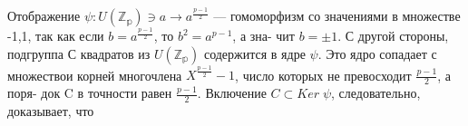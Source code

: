 \begin{myproof}
 Отображение $\psi : U(\mathbb{Z_{p}}) \owns a \to a^{\frac{p-1}{2}}$ --- гомоморфизм со значениями \linebreak  в множестве {-1,1}, так как если $b = a^{\frac{p-1}{2}}$, то $b^{2} = a^{p-1}$, а зна- \linebreak чит $b = \pm 1$. С другой стороны, подгруппа С квадратов из $U(\mathbb{Z_{p}})$ \linebreak содержится в ядре $\psi$. Это ядро сопадает с множествои корней \linebreak многочлена $X^{\frac{p-1}{2}} - 1$, число которых не превосходит $\frac{p-1}{2}$, а поря- \linebreak док C в точности равен $\frac{p-1}{2}$. Включение $C \subset Ker \; \psi$, следовательно, доказывает, что
\end{myproof}
\newpage
